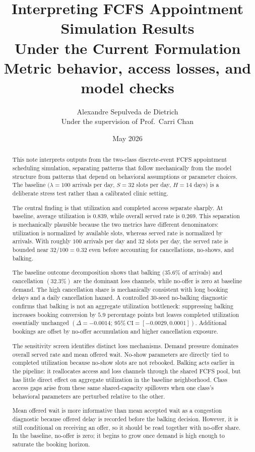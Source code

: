 \documentclass[11pt]{article}
\title{Interpreting FCFS Appointment Simulation Results\\
Under the Current Formulation\\[0.4em]
\large Metric behavior, access losses, and model checks}
\author{Alexandre Sepulveda de Dietrich\\[0.3em]
\small Under the supervision of Prof.\ Carri Chan}
\date{May 2026}
\begin{document}
\maketitle

\begin{abstract}
This note interprets outputs from the two-class discrete-event FCFS appointment
scheduling simulation, separating patterns that follow mechanically from the
model structure from patterns that depend on behavioral assumptions or
parameter choices. The baseline \((\lambda=100\) arrivals per day,
\(S=32\) slots per day, \(H=14\) days) is a deliberate stress test rather
than a calibrated clinic setting.

The central finding is that utilization and completed access separate sharply.
At baseline, average utilization is \(0.839\), while overall served rate is
\(0.269\). This separation is mechanically plausible because the two metrics
have different denominators: utilization is normalized by available slots,
whereas served rate is normalized by arrivals. With roughly \(100\) arrivals
per day and \(32\) slots per day, the served rate is bounded near
\(32/100=0.32\) even before accounting for cancellations, no-shows, and
balking.

The baseline outcome decomposition shows that balking \((35.6\%\) of
arrivals) and cancellation \((32.3\%)\) are the dominant loss channels, while
no-offer is zero at baseline demand. The high cancellation share is
mechanically consistent with long booking delays and a daily cancellation
hazard. A controlled \(30\)-seed no-balking diagnostic confirms that balking is
not an aggregate utilization bottleneck: suppressing balking increases booking
conversion by \(5.9\) percentage points but leaves completed utilization
essentially unchanged \((\Delta=-0.0014;\ 95\%\ \mathrm{CI}=[-0.0029,0.0001])\).
Additional bookings are offset by no-offer accumulation and higher cancellation
exposure.

The sensitivity screen identifies distinct loss mechanisms. Demand pressure
dominates overall served rate and mean offered wait. No-show parameters are
directly tied to completed utilization because no-show slots are not rebooked.
Balking acts earlier in the pipeline: it reallocates access and loss channels
through the shared FCFS pool, but has little direct effect on aggregate
utilization in the baseline neighborhood. Class access gaps arise from these
same shared-capacity spillovers when one class's behavioral parameters are
perturbed relative to the other.

Mean offered wait is more informative than mean accepted wait as a congestion
diagnostic because offered delay is recorded before the balking decision.
However, it is still conditional on receiving an offer, so it should be read
together with no-offer share. In the baseline, no-offer is zero; it begins to
grow once demand is high enough to saturate the booking horizon.
\end{abstract}
\end{document}
